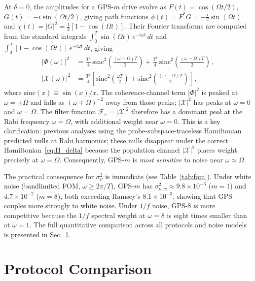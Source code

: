 \documentclass[aps,pra,twocolumn,superscriptaddress,longbibliography]{revtex4-2}
\begin{document}
At $\delta=0$, the amplitudes for a GPS-$m$ drive evolve as
$F(t)=\cos(\Omega t/2)$, $G(t)=-i\sin(\Omega t/2)$, giving path functions
$\phi(t)=F^*G=-\tfrac{i}{2}\sin(\Omega t)$ and
$\chi(t)=|G|^2=\tfrac{1}{2}[1-\cos(\Omega t)]$.
Their Fourier transforms are computed from the standard integrals
$\int_0^T \sin(\Omega t)\,e^{-i\omega t}\,dt$ and
$\int_0^T [1-\cos(\Omega t)]\,e^{-i\omega t}\,dt$, giving
\begin{align}
  |\Phi(\omega)|^2 &= \frac{T^2}{4}\,\mathrm{sinc}^2\!\!\left(\frac{(\omega-\Omega)T}{2}\right)
    + \frac{T^2}{4}\,\mathrm{sinc}^2\!\!\left(\frac{(\omega+\Omega)T}{2}\right)\,,
    \label{eq:Phi_GPS} \\
  |\mathcal{X}(\omega)|^2 &= \frac{T^2}{4}\left[\mathrm{sinc}^2\!\!\left(\frac{\omega T}{2}\right)
    + \mathrm{sinc}^2\!\!\left(\frac{(\omega-\Omega)T}{2}\right)\right]\,,
    \label{eq:X_GPS}
\end{align}
where $\mathrm{sinc}(x)\equiv\sin(x)/x$.
The coherence-channel term $|\Phi|^2$ is peaked at $\omega=\pm\Omega$ and falls
as $(\omega\mp\Omega)^{-2}$ away from those peaks;
$|\mathcal{X}|^2$ has peaks at $\omega=0$ and $\omega=\Omega$.
The filter function $\mathcal{F}_e = |\mathcal{X}|^2$ therefore has a dominant
\emph{peak} at the Rabi frequency $\omega=\Omega$, with additional weight near $\omega=0$.
This is a key clarification: previous analyses using the probe-subspace-traceless
Hamiltonian predicted nulls at Rabi harmonics; these nulls disappear under the
correct Hamiltonian~\eqref{eq:H_delta} because the population channel $|\mathcal{X}|^2$
places weight precisely at $\omega=\Omega$.
Consequently, GPS-$m$ is \emph{most sensitive} to noise near $\omega\approx\Omega$.

The practical consequence for $\sigma^2_\nu$ is immediate (see Table~\ref{tab:fom}).
Under white noise (bandlimited FOM, $\omega\geq 2\pi/T$), GPS-$m$ has
$\sigma^2_{\nu,w}\approx 9.8\times10^{-3}$ ($m=1$) and $4.7\times10^{-2}$ ($m=8$),
both exceeding Ramsey's $8.1\times10^{-3}$, showing that GPS couples more strongly to white noise.
Under $1/f$ noise, GPS-$8$ is more competitive because the $1/f$
spectral weight at $\omega=8$ is eight times smaller than at $\omega=1$.
The full quantitative comparison across all protocols and noise models is
presented in Sec.~\ref{sec:analytics}.

\section{Protocol Comparison}
\label{sec:analytics}
\end{document}
